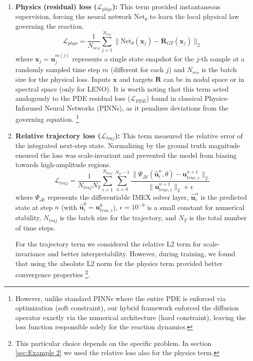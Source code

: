 \begin{enumerate}
    \item \textbf{Physics (residual) loss ($\mathcal{L}_{phys}$):} 
    This term provided instantaneous supervision, forcing the neural network $\text{Net}_\theta$ to learn the local physical law governing the reaction.
\begin{equation}
    \mathcal{L}_{phys} = \frac{1}{N_{res}} \sum_{j=1}^{N_{res}} \| \text{Net}_\theta(\mathbf{x}_j) - \mathbf{R}_{GT}(\mathbf{x}_j) \|_2
\end{equation}
where $\mathbf{x}_j = \mathbf{u}_j^{m\left( j \right)}$ represents a single state snapshot for the $j$-th sample at a randomly sampled time step $m$ (different for each $j$) and $N_{res}$ is the batch size for the physical loss. Inputs $\mathbf{x}$ and targets $\mathbf{R}$ can be in nodal space or in spectral space (only for LENO).
\newline
    It is worth noting that this term acted analogously to the PDE residual loss ($\mathcal{L}_{PDE}$) found in classical Physics-Informed Neural Networks (PINNs), as it penalizes deviations from the governing equation.
    \footnote{However, unlike standard PINNs where the entire PDE is enforced via optimization (soft constraint), our hybrid framework enforced the diffusion
     operator exactly via the numerical architecture (hard constraint), leaving the loss function responsible solely for the reaction dynamics.}

\item \textbf{Relative trajectory loss ($\mathcal{L}_{traj}$):}
This term measured the relative error of the integrated next-step state. Normalizing by the ground truth magnitude ensured the loss was scale-invariant and prevented the model from biasing towards high-amplitude regions.
\begin{equation}
    \mathcal{L}_{traj} = \frac{1}{N_{traj} N_T} \sum_{i=1}^{N_{traj}} \sum_{n=0}^{N_T-1} \frac{\| \Psi_{\Delta t}(\hat{\mathbf{u}}^n_i, \theta) - \mathbf{u}^{n+1}_{true, i} \|_2}{\| \mathbf{u}^{n+1}_{true, i} \|_2 + \epsilon}
\end{equation}
where $\Psi_{\Delta t}$ represents the differentiable IMEX solver layer, $\hat{\mathbf{u}}^n_i$ is the predicted state at step $n$ (with $\hat{\mathbf{u}}^0_i = \mathbf{u}^0_{true, i}$), $\epsilon=10^{-6}$ is a small constant for numerical stability, $N_{traj}$ is the batch size for the trajectory, and $N_T$ is the total number of time steps.

    For the trajectory term we considered the relative L2 term for scale-invariance and better interpretability. However, during training, 
    we found that using the absolute L2 norm for the physics term provided better convergence properties \footnote{This particular choice depends on the specific problem. In section \ref{sec:Example 2} we used the relative loss also for the physics term.}.
\end{enumerate}



